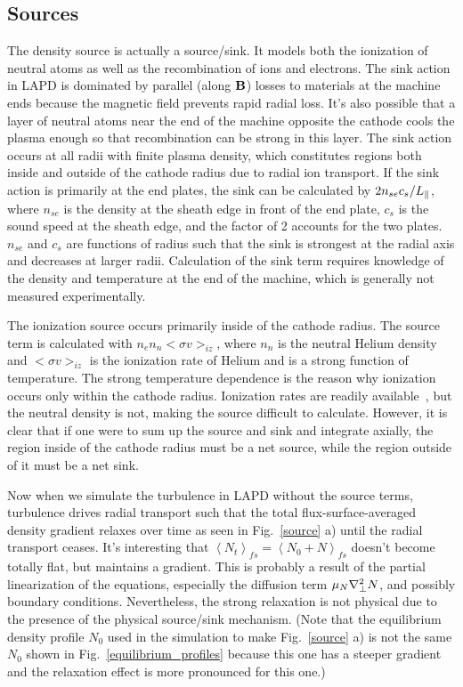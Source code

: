 \subsection{Sources}
\label{ss_sources}

The density source is actually a source/sink. It models both the ionization of neutral atoms as well as the recombination of ions and electrons. The sink action in LAPD
is dominated by parallel (along ${\bf B}$) losses to materials at the machine ends because the magnetic field prevents rapid radial loss. 
It's also possible that a layer of neutral atoms near the end of
the machine opposite the cathode cools the plasma enough so that recombination can be strong in this layer. The sink action occurs at all radii with finite plasma density, which constitutes regions
both inside and outside of the cathode radius due to radial ion transport. If the sink action is primarily at the end plates, the sink can be calculated by $2 n_{se} c_s/L_{\parallel}$, where
$n_{se}$ is the density at the sheath edge in front of the end plate, $c_s$ is the sound speed at the sheath edge, and the factor of 2 accounts for the two plates. $n_{se}$ and $c_s$ are functions
of radius such that the sink is strongest at the radial axis and decreases at larger radii. Calculation of the sink term requires knowledge of the density and temperature at the end of the machine,
which is generally not measured experimentally.

The ionization source occurs primarily inside of the cathode radius. The source term is calculated with $n_e n_n <\sigma v>_{iz}$, where $n_n$ is the neutral Helium density and $<\sigma v>_{iz}$
is the ionization rate of Helium and is a strong function of temperature. The strong temperature dependence is the reason why ionization occurs only within the cathode radius.
Ionization rates are readily available~\cite{stangeby2000}, but the neutral density is not, making the source difficult to calculate. However, it is clear that if one were to sum up
the source and sink and integrate axially, the region inside of the cathode radius must be a net source, while the region outside of it must be a net sink.

Now when we simulate the turbulence in LAPD without the source terms, turbulence drives radial transport such that the total flux-surface-averaged density gradient relaxes over time as seen
in Fig.~\ref{source} a) until the radial transport ceases. It's interesting that $\left< N_t \right>_{fs} = \left< N_0 + N \right>_{fs}$ doesn't become totally flat, but maintains a gradient. 
This is probably a result
of the partial linearization of the equations, especially the diffusion term $\mu_N \nabla_\perp^2 N$, and possibly boundary conditions. Nevertheless, the strong relaxation is not physical due
to the presence of the physical source/sink mechanism. (Note that the equilibrium density profile $N_0$ used in the simulation to make Fig.~\ref{source} a)
is not the same $N_0$ shown in Fig.~\ref{equilibrium_profiles} because this one has a steeper gradient and the relaxation effect is more pronounced for this one.)

